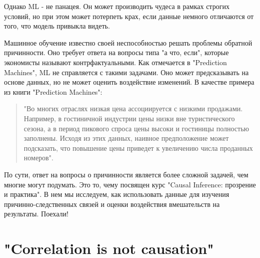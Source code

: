 \documentclass{article}
\newcommand{\coursename}{Causal Inference: прозрение и практика}
\begin{document}
        Однако ML - не панацея. Он может производить чудеса в рамках строгих условий, но при этом может потерпеть крах, если данные немного отличаются от того, что модель привыкла видеть.


        Машинное обучение известно своей неспособностью решать проблемы обратной причинности. Оно требует ответа на вопросы типа "а что, если"{}, которые экономисты называют контрфактуальными. Как отмечается в "Prediction Machines"{}, ML не справляется с такими задачами. Оно может предсказывать на основе данных, но не может оценить воздействие изменений. В качестве примера из книги "Prediction Machines":

        \begin{quote}
            "Во многих отраслях низкая цена ассоциируется с низкими продажами. Например, в гостиничной индустрии цены низки вне туристического сезона, а в период пикового спроса цены высоки и гостиницы полностью заполнены. Исходя из этих данных, наивное предположение может подсказать, что повышение цены приведет к увеличению числа проданных номеров".
        \end{quote}

        По сути, ответ на вопросы о причинности является более сложной задачей, чем многие могут подумать. Это то, чему посвящен курс "\coursename". В нем мы исследуем, как использовать данные для изучения причинно-следственных связей и оценки воздействия вмешательств на результаты. Поехали!

    \section*{"Correlation is not causation"}





\end{document}
